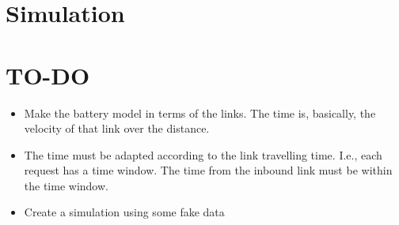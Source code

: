 \section{Simulation}
\section{TO-DO}
\begin{itemize}
	\item Make the battery model in terms of the links. The time is, basically, the velocity of that link over the distance.
	\item The time must be adapted according to the link travelling time. I.e., each request has a time window. The time from the inbound link must be within the time window.
	\item Create a simulation using some fake data
\end{itemize}

